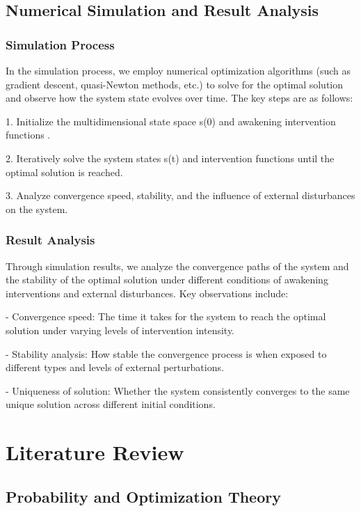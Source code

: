 \documentclass{article}
\begin{document}
\subsection{Numerical Simulation and Result Analysis}

\subsubsection{Simulation Process}

In the simulation process, we employ numerical optimization algorithms (such as gradient descent, quasi-Newton methods, etc.) to solve for the optimal solution and observe how the system state evolves over time. The key steps are as follows:

1. Initialize the multidimensional state space s(0) and awakening intervention functions {}.

2. Iteratively solve the system states s(t) and intervention functions {} until the optimal solution is reached.

3. Analyze convergence speed, stability, and the influence of external disturbances on the system.

\subsubsection{Result Analysis}

Through simulation results, we analyze the convergence paths of the system and the stability of the optimal solution under different conditions of awakening interventions and external disturbances. Key observations include:

- Convergence speed: The time it takes for the system to reach the optimal solution under varying levels of intervention intensity.

- Stability analysis: How stable the convergence process is when exposed to different types and levels of external perturbations.

- Uniqueness of solution: Whether the system consistently converges to the same unique solution across different initial conditions.

\section{Literature Review}

\subsection{Probability and Optimization Theory}
\end{document}
